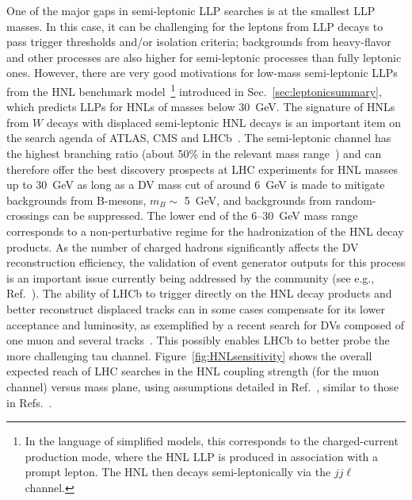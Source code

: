 {One of the major gaps in semi-leptonic LLP searches is at the smallest LLP masses. In this case, it can be challenging for the leptons from LLP decays to pass trigger thresholds and/or isolation criteria; backgrounds from heavy-flavor and other processes are also higher for semi-leptonic processes than fully leptonic ones. However, there are very good motivations for low-mass semi-leptonic LLPs from the HNL benchmark model~\footnote{In the language of simplified models, this corresponds to the charged-current production mode, where the HNL LLP is produced in association with a prompt lepton. The HNL then decays semi-leptonically via the $jj\ell$ channel.} introduced in Sec.~\ref{sec:leptonicsummary}, which predicts LLPs for HNLs of masses below 30~GeV. The signature of HNLs from $W$ decays with displaced semi-leptonic HNL decays is an important item on the search agenda of ATLAS, CMS and LHCb~\cite{Helo2014,Izaguirre2015,Mermod2017,Antusch2017,Nemevsek:2018bbt,Cottin:2018kmq}. The semi-leptonic channel has the highest branching ratio (about 50\% in the relevant mass range~\cite{Gronau1984}) and can therefore offer the best discovery prospects at LHC experiments for HNL masses up to 30~GeV as long as a DV mass cut of around 6~GeV is made to mitigate backgrounds from B-mesons, $m_B \sim$ 5~GeV, and backgrounds from random-crossings can be suppressed. The lower end of the 6--30~GeV mass range corresponds to a non-perturbative regime for the hadronization of the HNL decay products. As the number of charged hadrons significantly affects the DV reconstruction efficiency, the validation of event generator outputs for this process is an important issue currently being addressed by the community (see e.g., Ref.~\cite{Cottin:2018kmq}). The ability of LHCb to trigger directly on the HNL decay products and better reconstruct displaced tracks can in some cases compensate for its lower acceptance and luminosity, as exemplified by a recent search for DVs composed of one muon and several tracks~\cite{LHCb2017,Antusch2017}. This possibly enables LHCb to better probe the more challenging tau channel. Figure~\ref{fig:HNLsensitivity} shows the overall expected reach of LHC searches in the HNL coupling strength (for the muon channel) versus mass plane, using assumptions detailed in Ref.~\cite{Mermod2017}, similar to those in Refs.~\cite{Helo2014,Izaguirre2015}.

}
